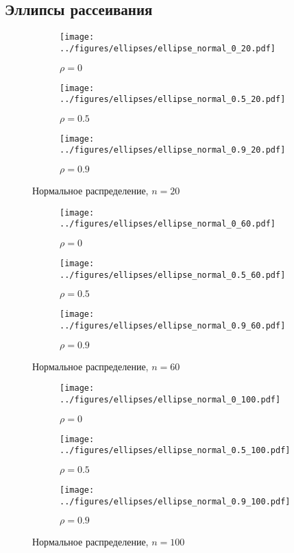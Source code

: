 \documentclass[12pt]{article}
\begin{document}
	\subsection{Эллипсы рассеивания}
	\begin{figure}[H]
		\centering
		\begin{subfigure}[t]{.3\linewidth}
			\centering\texttt{[image: ../figures/ellipses/ellipse\_normal\_0\_20.pdf]}
			\caption*{$\rho = 0$}
		\end{subfigure}
		\begin{subfigure}[t]{.3\linewidth}
			\centering\texttt{[image: ../figures/ellipses/ellipse\_normal\_0.5\_20.pdf]}
			\caption*{$\rho = 0.5$}
		\end{subfigure}
		\begin{subfigure}[t]{.3\linewidth}
			\centering\texttt{[image: ../figures/ellipses/ellipse\_normal\_0.9\_20.pdf]}
			\caption*{$\rho = 0.9$}
		\end{subfigure}
		\caption{Нормальное распределение, $n=20$}
	\end{figure}
	\begin{figure}[H]
		\centering
		\begin{subfigure}[t]{.3\linewidth}
			\centering\texttt{[image: ../figures/ellipses/ellipse\_normal\_0\_60.pdf]}
			\caption*{$\rho = 0$}
		\end{subfigure}
		\begin{subfigure}[t]{.3\linewidth}
			\centering\texttt{[image: ../figures/ellipses/ellipse\_normal\_0.5\_60.pdf]}
			\caption*{$\rho = 0.5$}
		\end{subfigure}
		\begin{subfigure}[t]{.3\linewidth}
			\centering\texttt{[image: ../figures/ellipses/ellipse\_normal\_0.9\_60.pdf]}
			\caption*{$\rho = 0.9$}
		\end{subfigure}
		\caption{Нормальное распределение, $n=60$}
	\end{figure}
	\begin{figure}[H]
		\centering
		\begin{subfigure}[t]{.3\linewidth}
			\centering\texttt{[image: ../figures/ellipses/ellipse\_normal\_0\_100.pdf]}
			\caption*{$\rho = 0$}
		\end{subfigure}
		\begin{subfigure}[t]{.3\linewidth}
			\centering\texttt{[image: ../figures/ellipses/ellipse\_normal\_0.5\_100.pdf]}
			\caption*{$\rho = 0.5$}
		\end{subfigure}
		\begin{subfigure}[t]{.3\linewidth}
			\centering\texttt{[image: ../figures/ellipses/ellipse\_normal\_0.9\_100.pdf]}
			\caption*{$\rho = 0.9$}
		\end{subfigure}
		\caption{Нормальное распределение, $n=100$}
	\end{figure}
	
\end{document}
